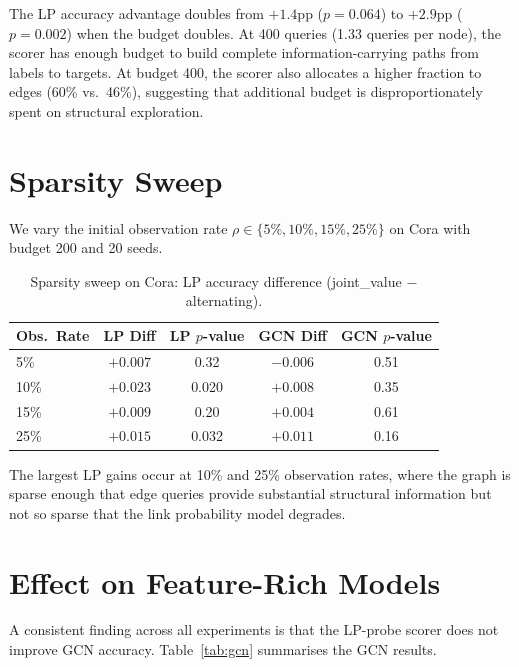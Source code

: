 \documentclass[12pt,a4paper,oneside]{report}
\begin{document}
The LP accuracy advantage doubles from $+1.4$pp ($p = 0.064$) to $+2.9$pp ($p = 0.002$) when the budget doubles. At 400 queries (1.33 queries per node), the scorer has enough budget to build complete information-carrying paths from labels to targets. At budget 400, the scorer also allocates a higher fraction to edges (60\% vs.\ 46\%), suggesting that additional budget is disproportionately spent on structural exploration.

\section{Sparsity Sweep}

We vary the initial observation rate $\rho \in \{5\%, 10\%, 15\%, 25\%\}$ on Cora with budget 200 and 20 seeds.

\begin{table}[htbp]
\centering
\caption{Sparsity sweep on Cora: LP accuracy difference (joint\_value $-$ alternating).}
\label{tab:sparsity}
\small
\begin{tabular}{lcccc}
\toprule
Obs.\ Rate & LP Diff & LP $p$-value & GCN Diff & GCN $p$-value \\
\midrule
5\%  & $+0.007$ & 0.32 & $-0.006$ & 0.51 \\
10\% & $+0.023$ & 0.020 & $+0.008$ & 0.35 \\
15\% & $+0.009$ & 0.20 & $+0.004$ & 0.61 \\
25\% & $+0.015$ & 0.032 & $+0.011$ & 0.16 \\
\bottomrule
\end{tabular}
\end{table}

The largest LP gains occur at 10\% and 25\% observation rates, where the graph is sparse enough that edge queries provide substantial structural information but not so sparse that the link probability model degrades.

\section{Effect on Feature-Rich Models}
\label{sec:gcn_analysis}

A consistent finding across all experiments is that the LP-probe scorer does not improve GCN accuracy. Table~\ref{tab:gcn} summarises the GCN results.
\end{document}
